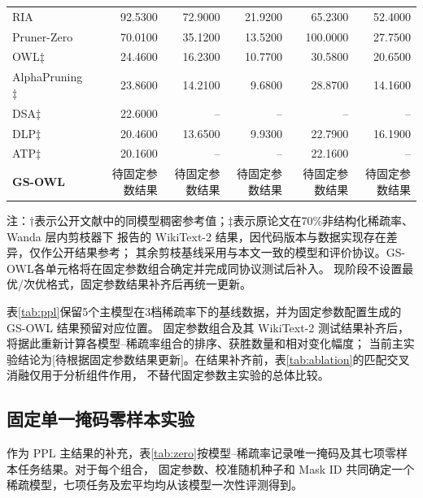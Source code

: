 \documentclass[UTF8,fontset=fandol]{ctexart}
\begin{document}
\begin{table}[!htbp]
\begin{tabular*}{0.98\textwidth}{@{\extracolsep{\fill}}lcrrrrr@{}}
  RIA & & 92.5300 & 72.9000 & 21.9200 & 65.2300 & 52.4000 \\
  Pruner-Zero & & 70.0100 & 35.1200 & 13.5200 & 100.0000 & 27.7500 \\
  OWL$\ddagger$ & & 24.4600 & 16.2300 & 10.7700 & 30.5800 & 20.6500 \\
  AlphaPruning$\ddagger$ & & 23.8600 & 14.2100 & 9.6800 & 28.8700 & 14.1600 \\
  DSA$\ddagger$ & & 22.6000 & -- & -- & -- & -- \\
  DLP$\ddagger$ & & 20.4600 & 13.6500 & 9.9300 & 22.7900 & 16.1900 \\
  ATP$\ddagger$ & & 20.1600 & -- & -- & 22.1600 & -- \\
  \textbf{GS-OWL} & & 待固定参数结果 & 待固定参数结果 & 待固定参数结果 & 待固定参数结果 & 待固定参数结果 \\
\bottomrule
\end{tabular*}
\vspace{2pt}
\parbox{0.98\textwidth}{\scriptsize
注：$\dagger$表示公开文献中的同模型稠密参考值；$\ddagger$表示原论文在70\%非结构化稀疏率、Wanda 层内剪枝器下
报告的 WikiText-2 结果\cite{owl,alphapruning,dsa,dlp,atp}，因代码版本与数据实现存在差异，仅作公开结果参考；
其余剪枝基线采用与本文一致的模型和评价协议。GS-OWL各单元格将在固定参数组合确定并完成同协议测试后补入。
现阶段不设置最优/次优格式，固定参数结果补齐后再统一更新。}
\end{table}

表\ref{tab:ppl}保留5个主模型在3档稀疏率下的基线数据，并为固定参数配置生成的 GS-OWL 结果预留对应位置。
固定参数组合及其 WikiText-2 测试结果补齐后，将据此重新计算各模型--稀疏率组合的排序、获胜数量和相对变化幅度；
当前主实验结论为[待根据固定参数结果更新]。在结果补齐前，表\ref{tab:ablation}的匹配交叉消融仅用于分析组件作用，
不替代固定参数主实验的总体比较。

\FloatBarrier
\subsection{固定单一掩码零样本实验}

作为 PPL 主结果的补充，表\ref{tab:zero}按模型--稀疏率记录唯一掩码及其七项零样本任务结果。对于每个组合，
固定参数、校准随机种子和 Mask ID 共同确定一个稀疏模型，七项任务及宏平均均从该模型一次性评测得到。
\end{document}
